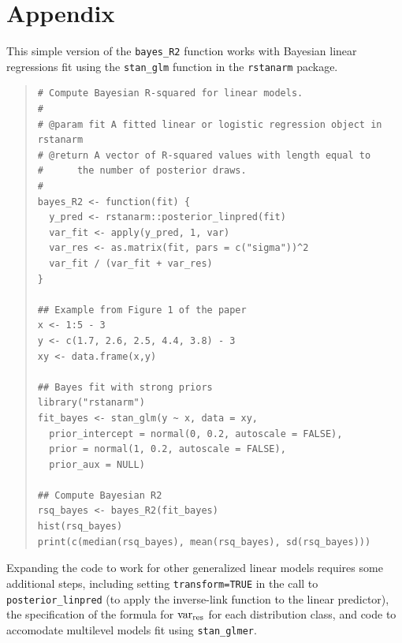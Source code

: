 \documentclass[11pt]{article}
\begin{document}



\clearpage
\section*{Appendix}

This simple version of the \verb#bayes_R2# function works with
Bayesian linear regressions fit using the
\verb#stan_glm# function in the {\tt rstanarm} package.

%
\vspace{-\baselineskip}
\begin{quotation}
\noindent
\begin{small}
\begin{verbatim}
# Compute Bayesian R-squared for linear models.
#
# @param fit A fitted linear or logistic regression object in rstanarm
# @return A vector of R-squared values with length equal to
#      the number of posterior draws.
#
bayes_R2 <- function(fit) {
  y_pred <- rstanarm::posterior_linpred(fit)
  var_fit <- apply(y_pred, 1, var)
  var_res <- as.matrix(fit, pars = c("sigma"))^2
  var_fit / (var_fit + var_res)
}

## Example from Figure 1 of the paper
x <- 1:5 - 3
y <- c(1.7, 2.6, 2.5, 4.4, 3.8) - 3
xy <- data.frame(x,y)

## Bayes fit with strong priors
library("rstanarm")
fit_bayes <- stan_glm(y ~ x, data = xy,
  prior_intercept = normal(0, 0.2, autoscale = FALSE),
  prior = normal(1, 0.2, autoscale = FALSE), 
  prior_aux = NULL)

## Compute Bayesian R2
rsq_bayes <- bayes_R2(fit_bayes)
hist(rsq_bayes)
print(c(median(rsq_bayes), mean(rsq_bayes), sd(rsq_bayes)))
\end{verbatim}
\end{small}
\end{quotation}
Expanding the code to work for other generalized linear models requires some additional steps, including setting \verb#transform=TRUE# in the call to
\verb#posterior_linpred# (to apply the inverse-link function to the linear
predictor), the specification of the formula for $\mbox{var}_{\rm res}$ for each distribution class, and code to accomodate multilevel models fit using \verb#stan_glmer#.
\end{document}
